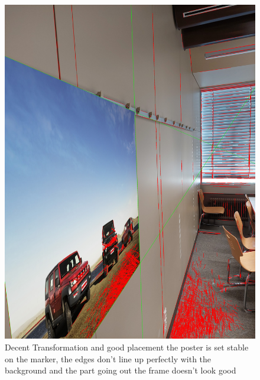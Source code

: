 \documentclass[a4paper,twocolumn]{article}
\begin{document}
    \begin{figure}[h!]
    \centering
    \includegraphics[width=0.9\columnwidth]{img/20221115_113437.jpg} %
    \caption{Decent Transformation and good placement the poster is set stable on the marker, the edges don't line up perfectly with the background and the part going out the frame doesn't look good}
    \label{fig:20221115_113437.jpg}
    \end{figure}
    
    
    
\end{document}
